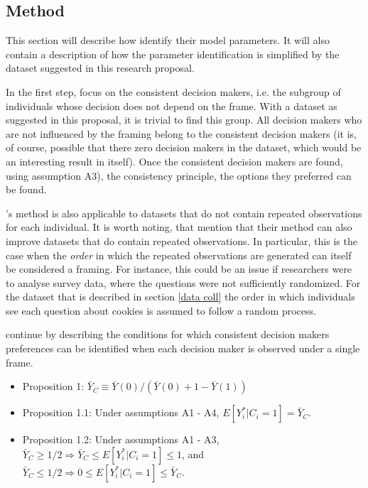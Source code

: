 \subsection{Method} \label{method}

This section will describe how \textcite{goldin2020} identify their model parameters. It will also contain a description
of how the parameter identification is simplified by the dataset suggested in this research proposal.

In the first step, \textcite{goldin2020} focus on the consistent decision makers, i.e. the subgroup of individuals
whose decision does not depend on the frame. With a dataset as suggested in this proposal, it is trivial to find this group. All decision makers who are not influenced by the framing belong to the consistent decision makers
(it is, of course, possible that there zero decision makers in the dataset, which would be an interesting result in itself). 
Once the consistent decision makers are found, using assumption A3), the consistency principle, the options they preferred can be found.

\textcite{goldin2020}'s method is also applicable to datasets that do not contain repeated observations for each individual.
It is worth noting, that \textcite{goldin2020} mention that their method can also improve datasets that do contain repeated observations.
In particular, this is the case when the \textit{order} in which the repeated observations are generated can itself be considered a framing. 
For instance, this could be an issue if researchers were to analyse survey data, where the questions were not sufficiently randomized. 
For the dataset that is described in section \ref{data coll} the order in which individuals see each question about cookies is assumed to follow a random process.

\textcite{goldin2020} continue by describing the conditions for which consistent decision makers preferences can be identified when each decision maker
is observed under a single frame. 

\begin{itemize}
    \item Proposition 1: $ \bar{Y}_C \equiv \bar{Y}(0)/(\bar{Y}(0) + 1 - \bar{Y}(1))$
    \item Proposition 1.1: Under assumptions A1 - A4, $ E[Y^*_i | C_i = 1] = \bar{Y}_C $.
    \item Proposition 1.2: Under assumptions A1 - A3, $ \bar{Y}_C \geq 1/2 \Rightarrow \bar{Y}_C \leq E[Y^*_i | C_i = 1] \leq 1$, and $\bar{Y}_C \leq 1/2 \Rightarrow 0 \leq E[Y^*_i| C_i = 1] \leq \bar{Y}_C$.
\end{itemize}

